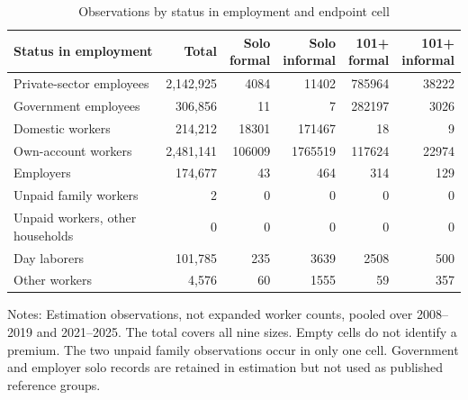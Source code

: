 \begin{table}[htbp]
\centering\small
\caption{Observations by status in employment and endpoint cell}
\label{tab:status-cells}
\begin{tabular}{p{}rrrrr}
\toprule
Status in employment & Total & \shortstack{Solo\\formal} & \shortstack{Solo\\informal} & \shortstack{101+\\formal} & \shortstack{101+\\informal} \\
\midrule
Private-sector employees & 2,142,925 & 4084 & 11402 & 785964 & 38222 \\
Government employees & 306,856 & 11 & 7 & 282197 & 3026 \\
Domestic workers & 214,212 & 18301 & 171467 & 18 & 9 \\
Own-account workers & 2,481,141 & 106009 & 1765519 & 117624 & 22974 \\
Employers & 174,677 & 43 & 464 & 314 & 129 \\
Unpaid family workers & 2 & 0 & 0 & 0 & 0 \\
Unpaid workers, other households & 0 & 0 & 0 & 0 & 0 \\
Day laborers & 101,785 & 235 & 3639 & 2508 & 500 \\
Other workers & 4,576 & 60 & 1555 & 59 & 357 \\
\bottomrule
\end{tabular}
\par\vspace{0.3em}
\begin{minipage}{0.97\textwidth}\footnotesize
Notes: Estimation observations, not expanded worker counts, pooled over 2008--2019 and 2021--2025. The total covers all nine sizes. Empty cells do not identify a premium. The two unpaid family observations occur in only one cell. Government and employer solo records are retained in estimation but not used as published reference groups.
\end{minipage}
\end{table}

